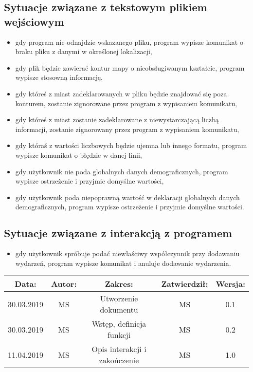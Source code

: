 \documentclass[a4paper,12pt]{article}
\begin{document}
\subsection{Sytuacje związane z tekstowym plikiem wejściowym}
\begin{itemize}
\item gdy program nie odnajdzie wskazanego pliku, program wypisze komunikat o braku pliku z danymi w określonej lokalizacji,
\item gdy plik będzie zawierać kontur mapy o nieobsługiwanym kształcie, program wypisze stosowną informację,
\item gdy któreś z miast zadeklarowanych w pliku będzie znajdować się poza konturem, zostanie zignorowane przez program z wypisaniem komunikatu,
\item gdy któreś z miast zostanie zadeklarowane z niewystarczającą liczbą informacji, zostanie zignorowany przez program z wypisaniem komunikatu,
\item gdy któraś z wartości liczbowych będzie ujemna lub innego formatu, program wypisze komunikat o błędzie w danej linii,
\item gdy użytkownik nie poda globalnych danych demograficznych, program wypisze ostrzeżenie i przyjmie domyślne wartości,
\item gdy użytkownik poda niepoprawną wartość w deklaracji globalnych danych demograficznych, program wypisze ostrzeżenie i przyjmie domyślne wartości.

\end{itemize}

\subsection{Sytuacje związane z interakcją z programem} 
\begin{itemize}
\item gdy użytkownik spróbuje podać niewłaściwy współczynnik przy dodawaniu wydarzeń, program wypisze komunikat i anuluje dodawanie wydarzenia.
\end{itemize}


\begin{center}
\begin{tabular}{ |c|c|c|c|c| } 
 \hline
 \textbf{Data:} & \textbf{Autor:} & \textbf{Zakres:} & \textbf{Zatwierdził:} & \textbf{Wersja:} \\ 
 \hline
 30.03.2019 & MS & Utworzenie dokumentu & MS & 0.1 \\ 
 \hline
 30.03.2019 & MS & Wstęp, definicja funkcji & MS & 0.2 \\ 
 \hline
 11.04.2019 & MS & Opis interakcji i zakończenie & MS & 1.0 \\ 
 \hline
 \end{tabular}
\end{center}
\end{document}

